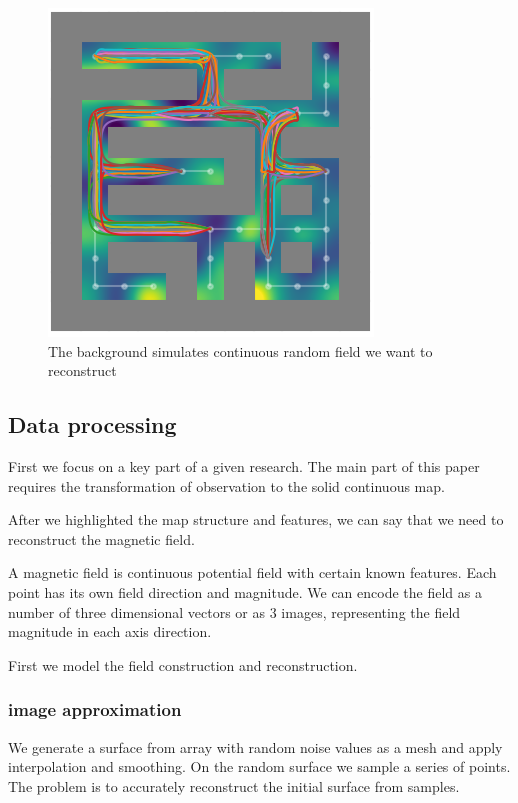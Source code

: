 \documentclass[a4paper, 12pt]{article}
\begin{document}
\begin{figure}
	\centering
	\includegraphics[width=0.7\linewidth]{images/routes3}
	\caption{The background simulates continuous random field we want to reconstruct}
	\label{fig:routes3}
\end{figure}

\subsection{Data processing}

First we focus on a key part of a given research. The main part of this paper requires the transformation of observation to the solid continuous map.

After we highlighted the map structure and features, we can say that we need to reconstruct the magnetic field.

A magnetic field is continuous potential field with certain known features. Each point has its own field direction and magnitude.
We can encode the field as a number of three dimensional vectors or as 3 images, representing the field magnitude in each axis direction.

First we model the field construction and reconstruction. 

\subsubsection{image approximation}

We generate a surface from array with random noise values as a mesh and apply interpolation and smoothing.
On the random surface we sample a series of points. The problem is to accurately reconstruct the initial surface from samples.
\end{document}
